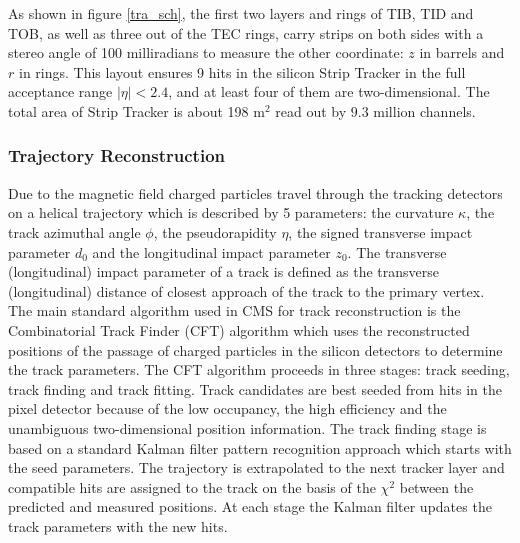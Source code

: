 As shown in figure \ref{tra_sch}, the first two layers and rings of TIB, TID and TOB, as
well as three out of the TEC rings, carry strips on both sides with a stereo angle
of 100 milliradians to measure the other coordinate: $z$ in barrels and $r$ in rings.
This layout ensures 9 hits in the silicon Strip Tracker in the full acceptance range
$|\eta|<2.4$, and at least four of them are two-dimensional. The total area of Strip
Tracker is about 198 m$^2$ read out by $9.3$ million channels.

\subsubsection{Trajectory Reconstruction}
Due to the magnetic field charged particles travel through the tracking detectors
on a helical trajectory which is described by 5 parameters: the curvature $\kappa$, the
track azimuthal angle $\phi$, the pseudorapidity $\eta$, the signed transverse impact parameter 
$d_0$ and the longitudinal impact parameter $z_0$. The transverse (longitudinal)
impact parameter of a track is defined as the transverse (longitudinal) distance of
closest approach of the track to the primary vertex. %
The main standard algorithm used in CMS for track reconstruction is the Combinatorial 
Track Finder (CFT) algorithm \cite{CFT} which uses the reconstructed positions
of the passage of charged particles in the silicon detectors to determine the track
parameters. The CFT algorithm proceeds in three stages: track seeding, track
finding and track fitting. Track candidates are best seeded from hits in the pixel
detector because of the low occupancy, the high efficiency and the unambiguous
two-dimensional position information. The track finding stage is based on a standard 
Kalman filter pattern recognition approach which starts with the seed
parameters. The trajectory is extrapolated to the next tracker layer and compatible 
hits are assigned to the track on the basis of the $\chi^2$ between the predicted and
measured positions. At each stage the Kalman filter updates the track parameters
with the new hits.

